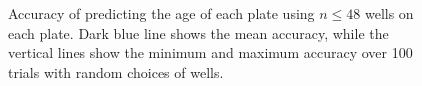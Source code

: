 \documentclass{article}
\begin{document}
\begin{figure}
	\centering
	\caption{Accuracy of predicting the age of each plate using $n \leq 48$ wells on each plate. Dark blue line shows the mean accuracy, while the vertical lines show the minimum and maximum accuracy over 100 trials with random choices of wells.}
\end{figure}
\end{document}
